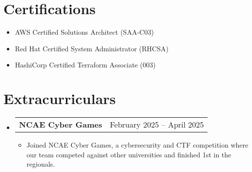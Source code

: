 \documentclass[letterpaper,11pt]{article}
\makeatletter
\newcommand{\resumeItem}[1]{
  \item\small{
    {#1 \vspace{-2pt}}
  }
}
\newcommand{\resumeProjectHeading}[2]{
    \item
    \begin{tabular*}{0.97\textwidth}{l@{\extracolsep{\fill}}r}
      \small#1 & #2 \\
    \end{tabular*}\vspace{-7pt}
}
\newcommand{\resumeSubHeadingListStart}{\begin{itemize}[leftmargin=0.08in, label={}]}
\newcommand{\resumeSubHeadingListEnd}{\end{itemize}}
\newcommand{\resumeItemListStart}{\begin{itemize}[leftmargin=0.22in]}
\newcommand{\resumeItemListEnd}{\end{itemize}\vspace{-5pt}}
\makeatother
\begin{document}
\section{Certifications}
    \vspace{-15pt} %
    \begin{multicols}{1}
        \begin{itemize}[itemsep=-1pt, parsep=3pt, leftmargin=0.22in]
        \small
            \item AWS Certified Solutions Architect (SAA-C03)
            \item Red Hat Certified System Administrator (RHCSA)
            \item HashiCorp Certified Terraform Associate (003)
        \end{itemize}
    \end{multicols}

\section{Extracurriculars}
  \resumeSubHeadingListStart
    \vspace{-2pt}
    \resumeProjectHeading
      {\textbf{NCAE Cyber Games}}{February 2025 -- April 2025}
      \resumeItemListStart
        \resumeItem{Joined NCAE Cyber Games, a cybersecurity and CTF competition where our team competed against other universities and finished 1st in the regionals.}
      \resumeItemListEnd
      
  \resumeSubHeadingListEnd


\end{document}

